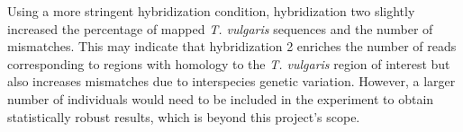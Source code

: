 Using a more stringent hybridization condition, hybridization two slightly increased the percentage of mapped \textit{T. vulgaris} sequences and the number of mismatches. This may indicate that hybridization 2 enriches the number of reads corresponding to regions with homology to the \textit{T. vulgaris} region of interest but also increases mismatches due to interspecies genetic variation. However, a larger number of individuals would need to be included in the experiment to obtain statistically robust results, which is beyond this project's scope.